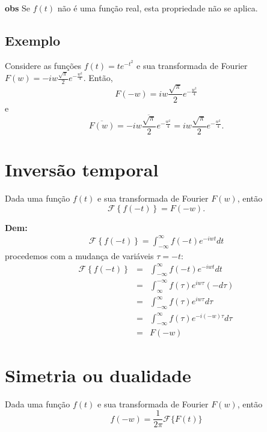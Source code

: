 \documentclass[a4paper,10pt]{book}
\begin{document}
{\bf obs} Se $f(t)$ não é uma função real, esta propriedade não se aplica.

\subsection{Exemplo}
Considere as funções $f(t)=te^{-t^2}$ e sua transformada de Fourier $F(w)=-iw\frac{\sqrt{\pi}}{2}e^{-\frac{w^2}{4}}$. Então,
 \begin{equation}
 F(-w)=iw\frac{\sqrt{\pi}}{2}e^{-\frac{w^2}{4}}
 \end{equation}
 e
 \begin{equation}
 \overline{F(w)}=\overline{-iw\frac{\sqrt{\pi}}{2}e^{-\frac{w^2}{4}}}=iw\frac{\sqrt{\pi}}{2}e^{-\frac{w^2}{4}}.
 \end{equation}

 \section{Inversão temporal}
\label{prop_inv_temp} Dada uma função $f(t)$ e sua transformada de Fourier $F(w)$, então \begin{equation}\mathcal{F}\left\{f(-t)\right\}=F(-w).\end{equation}

{\bf Dem:}
 \begin{eqnarray*}
 \mathcal{F}\left\{f(-t)\right\}=\int_{-\infty}^\infty f(-t) e^{-iwt}dt
 \end{eqnarray*}
 procedemos com a mudança de variáveis $\tau=-t$:
 \begin{eqnarray*}
 \mathcal{F}\left\{f(-t)\right\}&=&\int_{-\infty}^\infty f(-t) e^{-iwt}dt\\
 &=&\int_{\infty}^{-\infty} f(\tau) e^{iw\tau}(-d\tau) \\
 &=&\int_{-\infty}^{\infty} f(\tau) e^{iw\tau}d\tau \\
 &=&\int_{-\infty}^{\infty} f(\tau) e^{-i(-w)\tau}d\tau \\
 &=&F(-w)
 \end{eqnarray*}

\section{Simetria ou dualidade}\label{prop_sim_dua} Dada uma função $f(t)$ e sua transformada de Fourier $F(w)$, então 
 \begin{equation}
 f(-w)=\frac{1}{2\pi}\mathcal{F}\{F(t)\}
 \end{equation}
\end{document}
